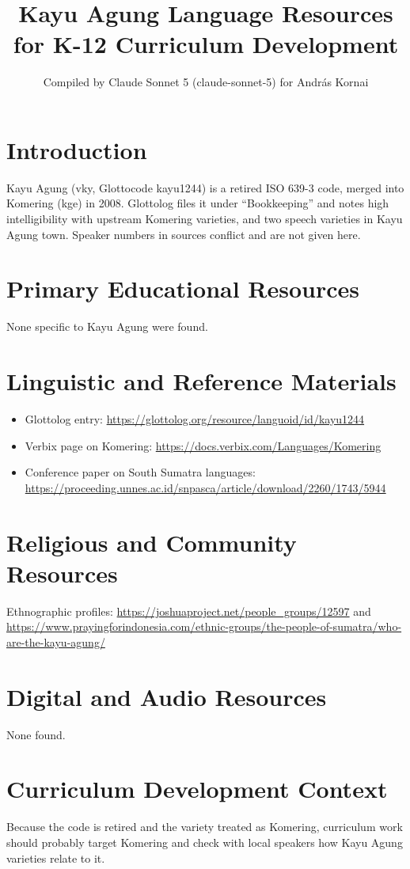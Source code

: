\documentclass[12pt]{article}
\title{Kayu Agung Language Resources for K-12 Curriculum Development}
\author{Compiled by Claude Sonnet 5 (claude-sonnet-5) for Andr\'as Kornai}
\date{}
\begin{document}
\maketitle

\section{Introduction}
Kayu Agung (vky, Glottocode kayu1244) is a retired ISO 639-3 code, merged into Komering (kge) in 2008. Glottolog files it under ``Bookkeeping'' and notes high intelligibility with upstream Komering varieties, and two speech varieties in Kayu Agung town. Speaker numbers in sources conflict and are not given here.

\section{Primary Educational Resources}
None specific to Kayu Agung were found.

\section{Linguistic and Reference Materials}
\begin{itemize}
\item Glottolog entry: \url{https://glottolog.org/resource/languoid/id/kayu1244}
\item Verbix page on Komering: \url{https://docs.verbix.com/Languages/Komering}
\item Conference paper on South Sumatra languages: \url{https://proceeding.unnes.ac.id/snpasca/article/download/2260/1743/5944}
\end{itemize}

\section{Religious and Community Resources}
Ethnographic profiles: \url{https://joshuaproject.net/people_groups/12597} and \url{https://www.prayingforindonesia.com/ethnic-groups/the-people-of-sumatra/who-are-the-kayu-agung/}

\section{Digital and Audio Resources}
None found.

\section{Curriculum Development Context}
Because the code is retired and the variety treated as Komering, curriculum work should probably target Komering and check with local speakers how Kayu Agung varieties relate to it.
\end{document}
